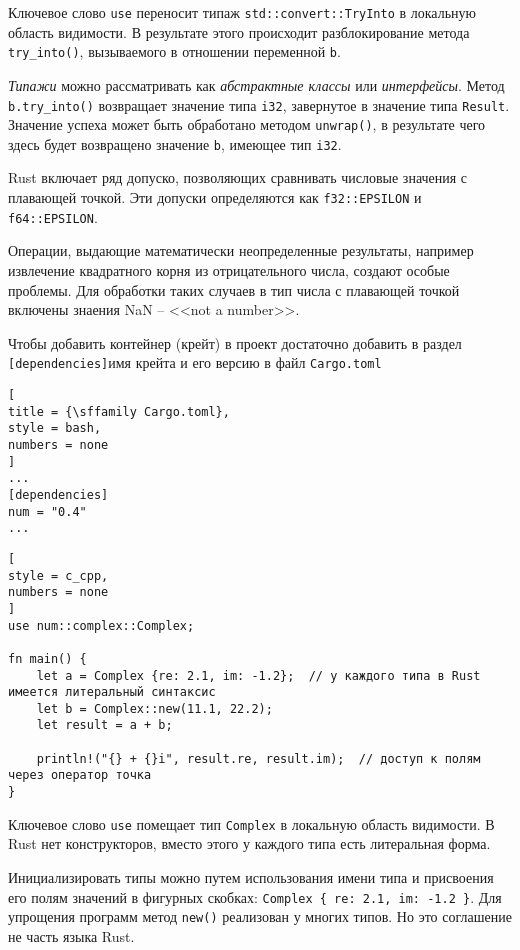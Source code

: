 \documentclass[%
	11pt,
	a4paper,
	utf8,
		]{article}
\begin{document}
Ключевое слово \texttt{use} переносит типаж \verb|std::convert::TryInto| в локальную область видимости. В результате этого происходит разблокирование метода \verb|try_into()|, вызываемого в отношении переменной \texttt{b}. 

\emph{Типажи} можно рассматривать как \emph{абстрактные классы} или \emph{интерфейсы}. Метод \verb|b.try_into()| возвращает значение типа \verb|i32|, завернутое в значение типа \texttt{Result}. Значение успеха может быть обработано методом \verb|unwrap()|, в результате чего здесь будет возвращено значение \texttt{b}, имеющее тип \verb|i32|.

Rust включает ряд допуско, позволяющих сравнивать числовые значения с плавающей точкой. Эти допуски определяются как \verb|f32::EPSILON| и \verb|f64::EPSILON|.

Операции, выдающие математически неопределенные результаты, например извлечение квадратного корня из отрицательного числа, создают особые проблемы. Для обработки таких случаев в тип числа с плавающей точкой включены знаения NaN -- <<not a number>>.

Чтобы добавить контейнер (крейт) в проект достаточно добавить в раздел \texttt{[dependencies]}имя крейта и его версию в файл \texttt{Cargo.toml}
\begin{lstlisting}[
title = {\sffamily Cargo.toml},
style = bash,
numbers = none
]
...
[dependencies]
num = "0.4"
...
\end{lstlisting}

\begin{lstlisting}[
style = c_cpp,
numbers = none
]
use num::complex::Complex;

fn main() {
    let a = Complex {re: 2.1, im: -1.2};  // у каждого типа в Rust имеется литеральный синтаксис
    let b = Complex::new(11.1, 22.2);
    let result = a + b;
    
    println!("{} + {}i", result.re, result.im);  // доступ к полям через оператор точка
}
\end{lstlisting}

Ключевое слово \texttt{use} помещает тип \texttt{Complex} в локальную область видимости. В Rust нет конструкторов, вместо этого у каждого типа есть литеральная форма.

Инициализировать типы можно путем использования имени типа и присвоения его полям значений в фигурных скобках: \verb|Complex { re: 2.1, im: -1.2 }|. Для упрощения программ метод \verb|new()| реализован у многих типов. Но это соглашение не часть языка Rust.
\end{document}
